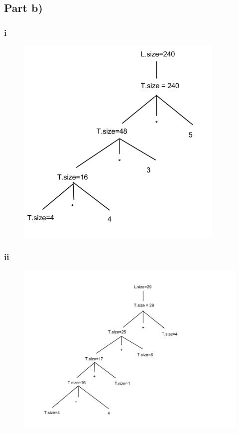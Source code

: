 \documentclass[paper=a4, fontsize=11pt]{scrartcl} %
\numberwithin{equation}{section} %
\numberwithin{figure}{section} %
\numberwithin{table}{section} %
\begin{document}
\newpage
\subsection{Part b)}

\subsubsection{i}
\begin{figure}[ht!]
\centering
\includegraphics[width=100mm]{taskbi.png}
\end{figure}

\newpage
\subsubsection{ii}
\begin{figure}[ht!]
\centering
\includegraphics[width=130mm]{task4bii.png}
\end{figure}

\end{document}
